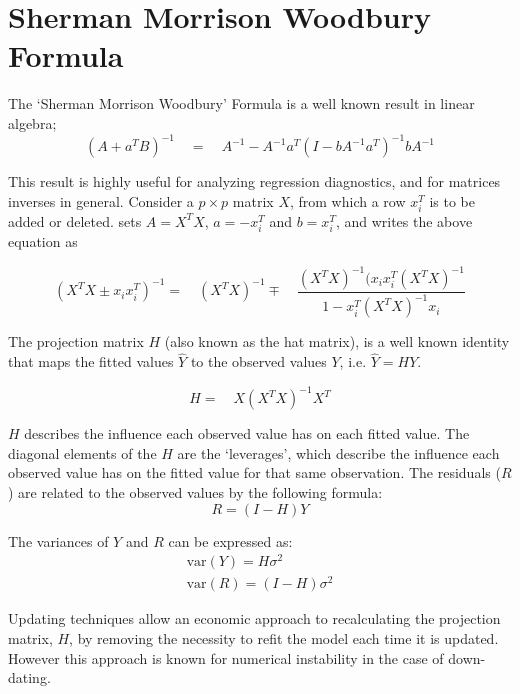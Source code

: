 \documentclass[12pt, a4paper]{report}
\theoremstyle{plain}
\theoremstyle{definition}
\theoremstyle{remark}
\begin{document}
	
	\section{Sherman Morrison Woodbury Formula} %
	
	The `Sherman Morrison Woodbury' Formula is a well known result in
	linear algebra;
	\begin{equation}
	(A+a^{T}B)^{-1} \quad = \quad A^{-1}-
	A^{-1}a^{T}(I-bA^{-1}a^{T})^{-1}bA^{-1}
	\end{equation}
	
	This result is highly useful for analyzing regression diagnostics,
	and for matrices inverses in general. Consider a $p \times p$
	matrix $X$, from which a row $x_{i}^{T}$ is to be added or
	deleted. \citet{CookWeisberg} sets $A = X^{T}X$, $a=-x_{i}^{T}$
	and $b=x_{i}^{T}$, and writes the above equation as
	
	\begin{equation}
	(X^{T}X \pm x_{i}x_{i}^{T})^{-1} = \quad(X^{T}X )^{-1} \mp \quad
	\frac{(X^{T}X)^{-1}(x_{i}x_{i}^{T}(X^{T}X)^{-1}}{1-x_{i}^{T}(X^{T}X)^{-1}x_{i}}
	\end{equation}
	
	The projection matrix $H$ (also known as the hat matrix), is a
	well known identity that maps the fitted values $\hat{Y}$ to the
	observed values $Y$, i.e. $\hat{Y} = HY$.
	
	\begin{equation}
	H =\quad X(X^{T}X)^{-1}X^{T}
	\end{equation}
	
	$H$ describes the influence each observed value has on each fitted value. The diagonal elements of the $H$ are the `leverages', which describe the influence each observed value has on the fitted value for that same observation. The residuals ($R$) are related to the observed values by the following formula:
	\begin{equation}
	R = (I-H)Y
	\end{equation}
	
	The variances of $Y$ and $R$ can be expressed as:
	\begin{eqnarray}
	\mbox{var}(Y) = H\sigma^{2} \nonumber\\
	\mbox{var}(R) = (I-H)\sigma^{2}
	\end{eqnarray}
	
	Updating techniques allow an economic approach to recalculating the projection matrix, $H$, by removing the necessity to refit the model each time it is updated. However this approach is known for
	numerical instability in the case of down-dating.
	
\end{document}
